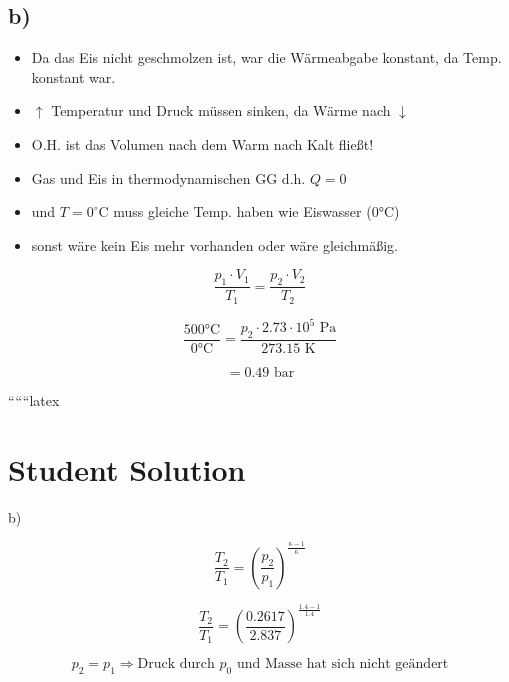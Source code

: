 

\subsection*{b)}

\begin{itemize}
    \item Da das Eis nicht geschmolzen ist, war die Wärmeabgabe konstant, da Temp. konstant war.
    \item $\uparrow$ Temperatur und Druck müssen sinken, da Wärme nach $\downarrow$
    \item O.H. ist das Volumen nach dem Warm nach Kalt fließt!
    \item Gas und Eis in thermodynamischen GG d.h. $Q = 0$
    \item und $T = 0^\circ \text{C}$ muss gleiche Temp. haben wie Eiswasser (0°C)
    \item sonst wäre kein Eis mehr vorhanden oder wäre gleichmäßig.
\end{itemize}

\[
\frac{p_1 \cdot V_1}{T_1} = \frac{p_2 \cdot V_2}{T_2}
\]

\[
\frac{500 \text{°C}}{0 \text{°C}} = \frac{p_2 \cdot 2.73 \cdot 10^5 \text{ Pa}}{273.15 \text{ K}}
\]

\[
= 0.49 \text{ bar}
\]

``````latex


\section*{Student Solution}

b) 

\[
\frac{T_2}{T_1} = \left( \frac{p_2}{p_1} \right)^{\frac{\kappa - 1}{\kappa}}
\]

\[
\frac{T_2}{T_1} = \left( \frac{0.2617}{2.837} \right)^{\frac{1.4 - 1}{1.4}}
\]

\[
p_2 = p_1 \Rightarrow \text{Druck durch } p_0 \text{ und Masse hat sich nicht geändert}
\]